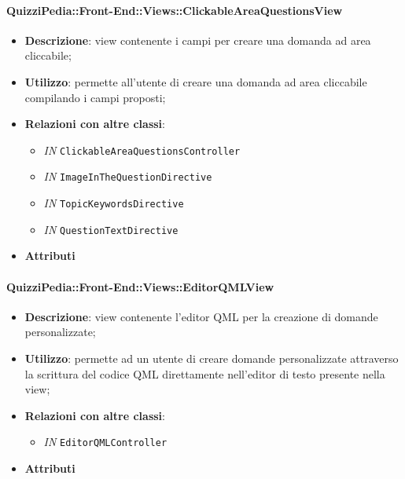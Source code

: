 \paragraph{QuizziPedia::Front-End::Views::ClickableAreaQuestionsView}
\begin{itemize}
	\item \textbf{Descrizione}: view contenente i campi per creare una domanda ad area cliccabile;
	\item \textbf{Utilizzo}:  permette all'utente di creare una domanda ad area cliccabile compilando i campi proposti;
	\item \textbf{Relazioni con altre classi}:
	\begin{itemize}
		\item \textit{IN} \texttt{ClickableAreaQuestionsController} \\
		\item \textit{IN} \texttt{ImageInTheQuestionDirective} \\
		\item \textit{IN} \texttt{TopicKeywordsDirective} \\
		\item \textit{IN} \texttt{QuestionTextDirective} \\ 
	\end{itemize}
	\item \textbf{Attributi}
\end{itemize}

\paragraph{QuizziPedia::Front-End::Views::EditorQMLView}
\begin{itemize}
	\item \textbf{Descrizione}: view contenente l'editor QML per la creazione di domande personalizzate;
	\item \textbf{Utilizzo}: permette ad un utente di creare domande personalizzate attraverso la scrittura del codice QML direttamente nell'editor di testo presente nella view;
	\item \textbf{Relazioni con altre classi}:
	\begin{itemize}
		\item \textit{IN} \texttt{EditorQMLController} \\
	\end{itemize}
	\item \textbf{Attributi}
\end{itemize}


